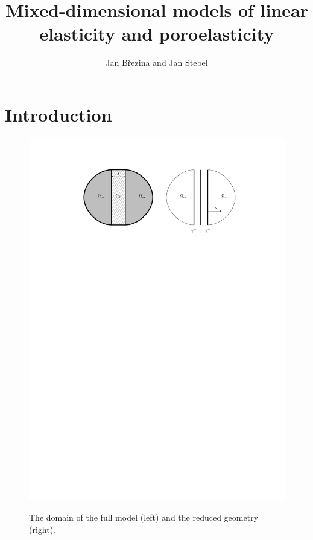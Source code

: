 \documentclass[a4paper]{article}
\begin{document}
\title{Mixed-dimensional models of linear elasticity and poroelasticity}
\author{Jan Březina and Jan Stebel}
\maketitle

\section{Introduction}


\begin{figure}[h]
\centering
\includegraphics[width=\textwidth]{figures/omegas}
\label{fig:omegas}
\caption{The domain of the full model (left) and the reduced geometry (right).}
\end{figure}
\end{document}
